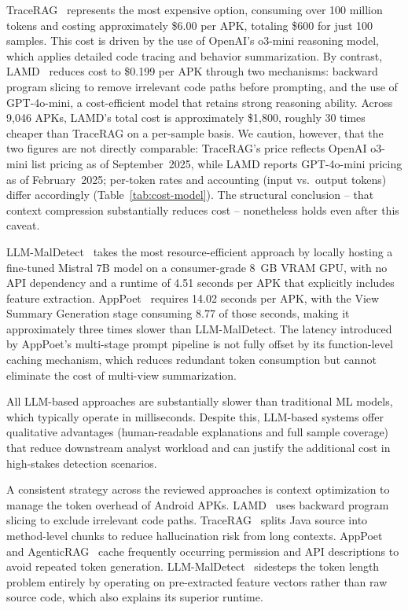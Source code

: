 TraceRAG~\cite{Zhang2025-ot} represents the most expensive option, consuming over 100 million tokens and costing approximately \$6.00 per APK, totaling \$600 for just 100 samples. This cost is driven by the use of OpenAI's o3-mini reasoning model, which applies detailed code tracing and behavior summarization. By contrast, LAMD~\cite{Qian2025-ua} reduces cost to \$0.199 per APK through two mechanisms: backward program slicing to remove irrelevant code paths before prompting, and the use of GPT-4o-mini, a cost-efficient model that retains strong reasoning ability. Across 9{,}046 APKs, LAMD's total cost is approximately \$1{,}800, roughly 30 times cheaper than TraceRAG on a per-sample basis. We caution, however, that the two figures are not directly comparable: TraceRAG's price reflects OpenAI o3-mini list pricing as of September~2025, while LAMD reports GPT-4o-mini pricing as of February~2025; per-token rates and accounting (input vs.\ output tokens) differ accordingly (Table~\ref{tab:cost-model}). The structural conclusion -- that context compression substantially reduces cost -- nonetheless holds even after this caveat.

LLM-MalDetect~\cite{Feng2025-ry} takes the most resource-efficient approach by locally hosting a fine-tuned Mistral 7B model on a consumer-grade 8~GB VRAM GPU, with no API dependency and a runtime of 4.51 seconds per APK that explicitly includes feature extraction. AppPoet~\cite{Zhao2024-dw} requires 14.02 seconds per APK, with the View Summary Generation stage consuming 8.77 of those seconds, making it approximately three times slower than LLM-MalDetect. The latency introduced by AppPoet's multi-stage prompt pipeline is not fully offset by its function-level caching mechanism, which reduces redundant token consumption but cannot eliminate the cost of multi-view summarization.

All LLM-based approaches are substantially slower than traditional ML models, which typically operate in milliseconds. Despite this, LLM-based systems offer qualitative advantages (human-readable explanations and full sample coverage) that reduce downstream analyst workload and can justify the additional cost in high-stakes detection scenarios.

A consistent strategy across the reviewed approaches is context optimization to manage the token overhead of Android APKs. LAMD~\cite{Qian2025-ua} uses backward program slicing to exclude irrelevant code paths. TraceRAG~\cite{Zhang2025-ot} splits Java source into method-level chunks to reduce hallucination risk from long contexts. AppPoet~\cite{Zhao2024-dw} and AgenticRAG~\cite{S2025-kj} cache frequently occurring permission and API descriptions to avoid repeated token generation. LLM-MalDetect~\cite{Feng2025-ry} sidesteps the token length problem entirely by operating on pre-extracted feature vectors rather than raw source code, which also explains its superior runtime.


